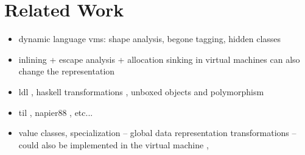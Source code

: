 \section{Related Work}
\label{sec:related}


\begin{itemize}
  \item dynamic language vms: shape analysis, begone tagging, hidden classes
  \item inlining + escape analysis + allocation sinking in virtual machines can also change the representation
  \item ldl \cite{ldl}, haskell transformations \cite{spj-unboxed-values} \cite{thiemann-unboxed-objects-cps} \cite{shao-flexible-representation-analysis}, unboxed objects and polymorphism \cite{leroy-unboxed-objects}
  \item til \cite{tarditi-til, harper-intensional-type-analysis}, napier88 \cite{morrison-napier88}, etc...
  \item value classes\cite{sip-value-classes}, specialization \cite{iuli-thesis, miniboxing} -- global data representation transformations -- could also be implemented in the virtual machine \cite{goetz-specialization}, \cite{rose-value-classes-vm, rose-value-classes-tearing}
\end{itemize}
